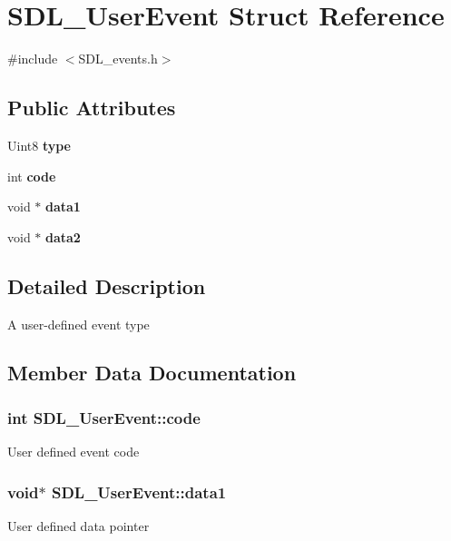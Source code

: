 \section{S\+D\+L\+\_\+\+User\+Event Struct Reference}
\label{struct_s_d_l___user_event}


{\ttfamily \#include $<$S\+D\+L\+\_\+events.\+h$>$}

\subsection*{Public Attributes}
\begin{DoxyCompactItemize}
\item 
Uint8 {\bf type}
\item 
int {\bf code}
\item 
void $\ast$ {\bf data1}
\item 
void $\ast$ {\bf data2}
\end{DoxyCompactItemize}


\subsection{Detailed Description}
A user-\/defined event type 

\subsection{Member Data Documentation}
\subsubsection[{code}]{\setlength{\rightskip}{0pt plus 5cm}int S\+D\+L\+\_\+\+User\+Event\+::code}\label{struct_s_d_l___user_event_aed0990a34143309d42e9d0f20a7a9cd4}
User defined event code 
\subsubsection[{data1}]{\setlength{\rightskip}{0pt plus 5cm}void$\ast$ S\+D\+L\+\_\+\+User\+Event\+::data1}\label{struct_s_d_l___user_event_ab2893a12be2f97195f16463a23107913}
User defined data pointer 
